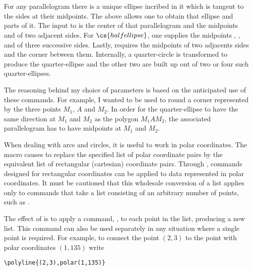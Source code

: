 \documentclass[letterpaper]{article}
\begin{document}
\begin{cd}
\\%
\\%
%
%
%
%
\end{cd}

For any parallelogram there is a unique ellipse incribed in it which is
tangent to the sides at their midpoints. The above allows one to obtain
that ellipse and parts of it. The input to  is the
center  of that parallelogram and the midpoints 
and  of two adjacent sides. For $\cs{halfellipse}$, one
supplies the midpoints , , and  of
three successive sides. Lastly,  requires the
midpoints of two adjacents sides and the corner  between them.
Internally, a quarter-circle is transformed to produce the
quarter-ellipse and the other two are built up out of two or four such
quarter-ellipses.

The reasoning behind my choice of parameters is based on the anticipated
use of these commands. For example, I wanted  to be
used to round a corner represented by the three points $M_1$,
$A$ and $M_2$. In order for the quarter-ellipse to have
the same direction at $M_1$ and $M_2$ as the polygon $M_1AM_2$, the
associated parallelogram has to have midpoints at $M_1$ and $M_2$.

\begin{cd}
%
%
\end{cd}

When dealing with arcs and circles, it is useful to work in polar
coordinates. The macro  causes \MF{} to replace the specified
list of polar coordinate pairs by the equivalent list of rectangular
(cartesian) coordinate pairs. Through , commands designed for
rectangular coordinates can be applied to data represented in polar
coordinates. It must be cautioned that this wholesale conversion of a
list applies only to commands that take a list consisting of an
arbitrary number of points, such as .

The effect of  is to apply a \MF{} command, , to each
point in the list, producing a new list. This \MF{} command can also be
used separately in any situation where a single \MF{} point is required. For
example, to connect the point $(2,3)$ to the point with polar
coordinates $(1, 135)$ write
\begin{verbatim}
\polyline{(2,3),polar(1,135)}
\end{verbatim}
\end{document}
